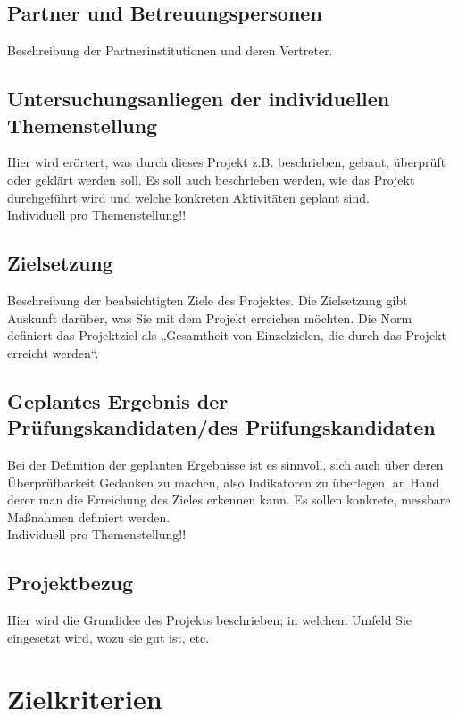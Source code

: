 \documentclass[12pt]{article}
\begin{document}
\subsection{Partner und Betreuungspersonen}
Beschreibung der Partnerinstitutionen und deren Vertreter.

\subsection{Untersuchungsanliegen der individuellen Themenstellung}
Hier wird erörtert, was durch dieses Projekt z.B. beschrieben, gebaut, überprüft oder geklärt werden soll.
Es soll auch beschrieben werden, wie das Projekt durchgeführt wird und welche konkreten Aktivitäten geplant sind. \\
Individuell pro Themenstellung!!

\subsection{Zielsetzung}
Beschreibung der beabsichtigten Ziele des Projektes.
Die Zielsetzung gibt Auskunft darüber, was Sie mit dem Projekt erreichen möchten.
Die Norm definiert das Projektziel als „Gesamtheit von Einzelzielen, die durch das Projekt erreicht werden“.

\subsection{Geplantes Ergebnis der Prüfungskandidaten/des Prüfungskandidaten}
Bei der Definition der geplanten Ergebnisse ist es sinnvoll, sich auch über deren Überprüfbarkeit Gedanken zu machen, also Indikatoren zu überlegen, an Hand derer man die Erreichung des Zieles erkennen kann.
Es sollen konkrete, messbare Maßnahmen definiert werden. \\
Individuell pro Themenstellung!!

\subsection{Projektbezug}
Hier wird die Grundidee des Projekts beschrieben;
in welchem Umfeld Sie eingesetzt wird, wozu sie gut ist, etc.

\section{Zielkriterien}
\end{document}
